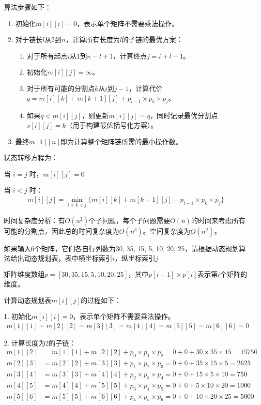 \documentclass[12pt,twoside]{article}
\begin{document}
\begin{problems}
算法步骤如下：
\begin{enumerate}
    \item 初始化$m[i][i] = 0$，表示单个矩阵不需要乘法操作。
    \item 对于链长$l$从2到$n$，计算所有长度为$l$的子链的最优方案：
    \begin{enumerate}
        \item 对于所有起点$i$从1到$n-l+1$，计算终点$j = i+l-1$。
        \item 初始化$m[i][j] = \infty$。
        \item 对于所有可能的分割点$k$从$i$到$j-1$，计算代价$q = m[i][k] + m[k+1][j] + p_{i-1} \times p_k \times p_j$。
        \item 如果$q < m[i][j]$，则更新$m[i][j] = q$，同时记录最优分割点$s[i][j] = k$（用于构建最优括号化方案）。
    \end{enumerate}
    \item 最终$m[1][n]$即为计算整个矩阵链所需的最小操作数。
\end{enumerate}

状态转移方程为：

当 $i = j$ 时，$m[i][j] = 0$

当 $i < j$ 时：
\begin{align}
m[i][j] = \min_{i \leq k < j} \{m[i][k] + m[k+1][j] + p_{i-1} \times p_k \times p_j\}
\end{align}

时间复杂度分析：有$O(n^2)$个子问题，每个子问题需要$O(n)$的时间来考虑所有可能的分割点，因此总的时间复杂度为$O(n^3)$。空间复杂度为$O(n^2)$。

\ppart 如果输入6个矩阵，它们各自行列数为30, 35, 15, 5, 10, 20, 25，请根据动态规划算法给出动态规划表，表中横坐标索引$i$，纵坐标索引$j$

矩阵维度数组$p = [30, 35, 15, 5, 10, 20, 25]$，其中$p[i-1] \times p[i]$表示第$i$个矩阵的维度。

计算动态规划表$m[i][j]$的过程如下：

1. 初始化$m[i][i] = 0$，表示单个矩阵不需要乘法操作。
\begin{align}
m[1][1] = m[2][2] = m[3][3] = m[4][4] = m[5][5] = m[6][6] = 0
\end{align}

2. 计算长度为2的子链：
\begin{align}
m[1][2] &= m[1][1] + m[2][2] + p_0 \times p_1 \times p_2 = 0 + 0 + 30 \times 35 \times 15 = 15750 \\
m[2][3] &= m[2][2] + m[3][3] + p_1 \times p_2 \times p_3 = 0 + 0 + 35 \times 15 \times 5 = 2625 \\
m[3][4] &= m[3][3] + m[4][4] + p_2 \times p_3 \times p_4 = 0 + 0 + 15 \times 5 \times 10 = 750 \\
m[4][5] &= m[4][4] + m[5][5] + p_3 \times p_4 \times p_5 = 0 + 0 + 5 \times 10 \times 20 = 1000 \\
m[5][6] &= m[5][5] + m[6][6] + p_4 \times p_5 \times p_6 = 0 + 0 + 10 \times 20 \times 25 = 5000
\end{align}


\end{problems}
\end{document}
